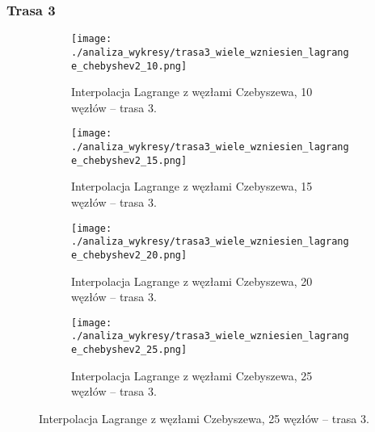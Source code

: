 \documentclass[a4paper,12pt]{article}
\begin{document}
\subsubsection{Trasa 3}
\begin{figure}[H]
    \centering
    \begin{subfigure}{0.45\textwidth}
        \centering
        \texttt{[image: ./analiza\_wykresy/trasa3\_wiele\_wzniesien\_lagrange\_chebyshev2\_10.png]}
        \caption{Interpolacja Lagrange z węzłami Czebyszewa, 10 węzłów – trasa 3.}
    \end{subfigure}\hfill
    \begin{subfigure}{0.45\textwidth}
        \centering
        \texttt{[image: ./analiza\_wykresy/trasa3\_wiele\_wzniesien\_lagrange\_chebyshev2\_15.png]}
        \caption{Interpolacja Lagrange z węzłami Czebyszewa, 15 węzłów – trasa 3.}
    \end{subfigure}
    
    \vspace{0.5cm}
    
    \begin{subfigure}{0.45\textwidth}
        \centering
        \texttt{[image: ./analiza\_wykresy/trasa3\_wiele\_wzniesien\_lagrange\_chebyshev2\_20.png]}
        \caption{Interpolacja Lagrange z węzłami Czebyszewa, 20 węzłów – trasa 3.}
    \end{subfigure}\hfill
    \begin{subfigure}{0.45\textwidth}
        \centering
        \texttt{[image: ./analiza\_wykresy/trasa3\_wiele\_wzniesien\_lagrange\_chebyshev2\_25.png]}
        \caption{Interpolacja Lagrange z węzłami Czebyszewa, 25 węzłów – trasa 3.}
    \end{subfigure}
\end{figure}
\end{document}
